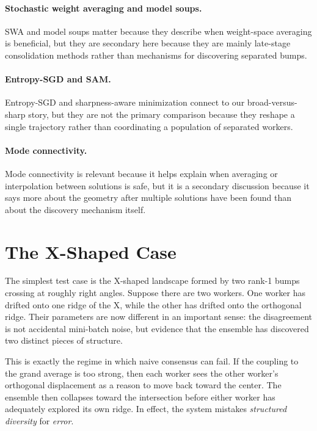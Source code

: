\documentclass{article}
\begin{document}
\paragraph{Stochastic weight averaging and model soups.}
SWA \cite{izmailov2018averaging} and model soups
\cite{wortsman2022model} matter because they describe when weight-space
averaging is beneficial, but they are secondary here because they are
mainly late-stage consolidation methods rather than mechanisms for
discovering separated bumps.

\paragraph{Entropy-SGD and SAM.}
Entropy-SGD \cite{chaudhari2017entropy} and sharpness-aware
minimization \cite{foret2021sharpness} connect to our broad-versus-sharp
story, but they are not the primary comparison because they reshape a
single trajectory rather than coordinating a population of separated
workers.

\paragraph{Mode connectivity.}
Mode connectivity \cite{garipov2018loss} is relevant because it helps
explain when averaging or interpolation between solutions is safe, but
it is a secondary discussion because it says more about the geometry
after multiple solutions have been found than about the discovery
mechanism itself.

\section{The X-Shaped Case}

The simplest test case is the X-shaped landscape formed by two rank-1
bumps crossing at roughly right angles. Suppose there are two workers.
One worker has drifted onto one ridge of the X, while the other has
drifted onto the orthogonal ridge. Their parameters are now different in
an important sense: the disagreement is not accidental mini-batch noise,
but evidence that the ensemble has discovered two distinct pieces of
structure.

This is exactly the regime in which naive consensus can fail. If the
coupling to the grand average is too strong, then each worker sees the
other worker's orthogonal displacement as a reason to move back toward
the center. The ensemble then collapses toward the intersection before
either worker has adequately explored its own ridge. In effect, the
system mistakes \emph{structured diversity} for \emph{error}.
\end{document}
